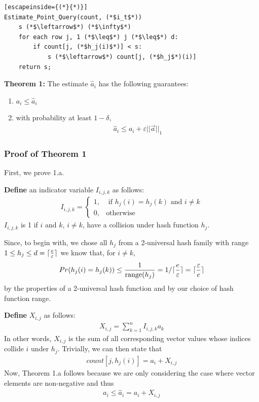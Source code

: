 \documentclass[11pt]{article}
\DeclarePairedDelimiter\ceil{\lceil}{\rceil}
\begin{document}
\begin{lstlisting}[escapeinside={(*}{*)}]
Estimate_Point_Query(count, (*$i_t$*)) 
    s (*$\leftarrow$*) (*$\infty$*)
    for each row j, 1 (*$\leq$*) j (*$\leq$*) d:
        if count[j, (*$h_j(i)$*)] < s:
            s (*$\leftarrow$*) count[j, (*$h_j$*)(i)]
    return s;
\end{lstlisting}

\textbf{Theorem 1:} The estimate $\hat a_i$ has the following guarantees:
\begin{enumerate}[label=\textnormal{(\arabic*)}]
    \item $a_i \leq \hat{a}_i$
    \item with probability at least $1 - \delta$, 
    \begin{align}
        \hat{a}_i \leq a_i + \varepsilon ||\vec{a}||_1 
    \end{align}
\end{enumerate}
\subsubsection{Proof of Theorem 1}
First, we prove 1.a.  

\textbf{Define} an indicator variable $I_{i, j, k}$ as follows:
\begin{align}
    I_{i, j, k} = 
    \begin{cases}
        1, & \text{ if } h_j(i) = h_j(k) \text{ and } i \neq k \\
        0, & \text{otherwise}
    \end{cases}
\end{align}
$I_{i, j, k}$ is 1 if $i$ and $k$, $i \neq k$, have a collision under hash function $h_j$.

Since, to begin with, we chose all $h_j$ from a 2-universal hash family
with range $1 \leq h_j \leq d = \ceil{\frac{e}{\varepsilon}}$ 
we know that, for $i \neq k$,
\begin{align}\label{eq:collision-prob}
    Pr(h_j(i) = h_j(k)) \leq \frac{1}{\text{range}(h_j)} = 1/\ceil{\frac{e}{\varepsilon}} = \ceil{\frac{\varepsilon}{e}}
\end{align}
by the properties of a 2-universal hash function and by our choice of hash function
range.

\textbf{Define} $X_{i, j}$ as follows:
\begin{align}
    X_{i, j} = \sum_{k = 1}^{n}I_{i, j, k} a_k
\end{align}
In other words, $X_{i, j}$ is the sum of all corresponding vector values whose indices
collide $i$ under $h_j$. Trivially, we can then state that
\begin{align}\label{eq:count-def}
    count[j, h_j(i)] = a_i + X_{i, j} 
\end{align}
Now, Theorem 1.a follows because we are only considering the case where vector
elements are non-negative and thus
\begin{align}
    a_i \leq \hat a_i = a_i + X_{i, j}
\end{align}
\end{document}
